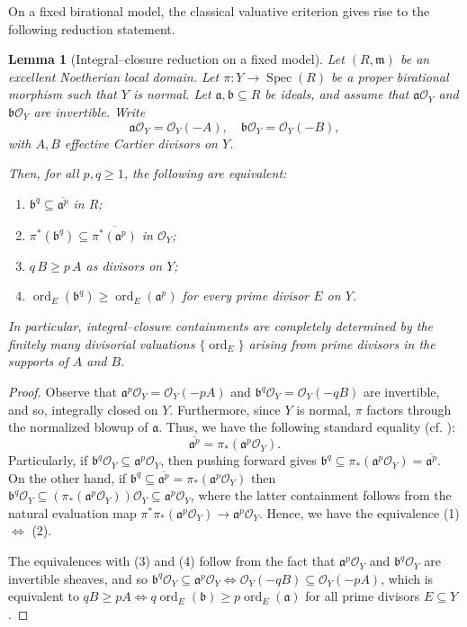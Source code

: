 \documentclass[12pt]{amsart}
\newcommand{\m}{\mathfrak m}
\newcommand{\ord}{\operatorname{\mathrm{ord}}}
\renewcommand{\a}{\mathfrak{a}}
\renewcommand{\b}{\mathfrak{b}}
\newcommand{\cO}{\mathcal{O}}
\DeclareMathOperator{\Spec}{Spec}
\theoremstyle{plain}
\newtheorem{lemma}[theorem]{Lemma}
\theoremstyle{definition}
\numberwithin{equation}{section}
\begin{document}
On a fixed birational model, the classical valuative criterion gives rise to the following reduction statement.

\begin{lemma}[Integral--closure reduction on a fixed model]
	\label{thm:IC-reduction}
	Let $(R,\m)$ be an excellent Noetherian local domain. Let $\pi: Y \to \Spec(R)$ be a proper birational morphism such that $Y$ is normal. Let $\a,\b\subseteq R$ be ideals, and assume that $\a\mathcal O_Y$ and $\b\mathcal O_Y$ are invertible. Write
	\[
	\a\mathcal O_Y=\mathcal O_Y(-A), \quad
	\b\mathcal O_Y=\mathcal O_Y(-B),
	\]
	with $A,B$ effective Cartier divisors on $Y$.
	
	Then, for all $p,q\ge 1$, the following are equivalent:
	\begin{enumerate}
		\item $\b^q \subseteq \overline{\a^p}$ in $R$;
		\item $\pi^*(\b^q)\subseteq \overline{\pi^*(\a^p)}$ in $\mathcal O_Y$;
		\item $q\,B \ge p\,A$ as divisors on $Y$;
		\item $\ord_E(\b^q)\ge \ord_E(\a^p)$ for every prime divisor $E$ on $Y$.
	\end{enumerate}
	In particular, integral--closure containments are completely determined by
	the finitely many divisorial valuations $\{\ord_E\}$ arising from prime divisors in the supports of $A$ and $B$.

\end{lemma}

\begin{proof} Observe that $\a^p\cO_Y = \cO_{Y}(-pA)$ and $\b^q\cO_Y = \cO_{Y}(-qB)$ are invertible, and so, integrally closed on $Y$. Furthermore, since $Y$ is normal, $\pi$ factors through the normalized blowup of $\a$. Thus, we have the following standard equality (cf. \cite[Chapters 10 and 19]{HS}):
	$$\overline{\a^p} = \pi_*(\a^p \cO_Y).$$
Particularly, if $\b^q\cO_Y \subseteq \a^p\cO_Y$, then pushing forward gives
$\b^q \subseteq \pi_*(\a^p\cO_Y) = \overline{\a^p}.$
On the other hand, if $\b^q \subseteq \overline{\a^p} = \pi_*(\a^p\cO_Y)$ then $\b^q \cO_Y \subseteq (\pi_*(\a^p\cO_Y))\cO_Y \subseteq \a^p\cO_Y$, where the latter containment follows from the natural evaluation map $\pi^*\pi_*(\a^p\cO_Y) \rightarrow \a^p\cO_Y$. Hence, we have the equivalence (1) $\Longleftrightarrow$ (2).

The equivalences with (3) and (4) follow from the fact that $\a^p\cO_Y$ and $\b^q\cO_Y$ are invertible sheaves, and so $\b^q \cO_Y \subseteq \a^p \cO_Y \Longleftrightarrow \cO_Y(-qB) \subseteq \cO_Y(-pA)$, which is equivalent to $qB \ge pA \Longleftrightarrow q\ord_E(\b) \ge p\ord_E(\a)$ for all prime divisors $E \subseteq Y$.
\end{proof}
\end{document}
